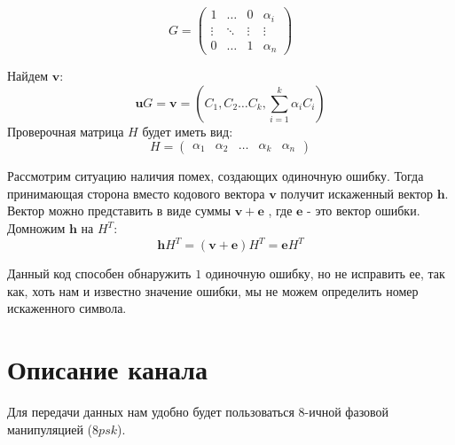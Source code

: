 \documentclass{ITaSconf}
\begin{document}
\begin{equation}\label{eq:pormatrix}
G = \left( \begin{array}{ccccccc}
1 & \dots  & 0 & \alpha_i \\
\vdots       &\ddots &  \vdots &  \vdots \\ 
0 & \dots  &  1&\alpha_n \end{array} \right)  
  \end{equation}

Найдем $\mathbold{v}$:
\begin{equation}\label{eq:kod}
\mathbold{u}G=\mathbold{v}=(C_1 , C_2 \dots C_k,\sum_{i=1}^k \alpha_i C_i)
 \end{equation}
Проверочная матрица $H$ будет иметь вид:
\begin{equation}H = \left( \begin{array}{ccccccc}\label{eq:H}
\alpha_1 & \alpha_2 &  \dots & \alpha_k & \alpha_n \end{array} \right) \end{equation}

Рассмотрим ситуацию наличия помех, создающих одиночную ошибку. Тогда принимающая сторона вместо кодового вектора $\mathbold{v}$  получит искаженный вектор $\mathbold{h}$. Вектор  можно представить в виде суммы
$\mathbold{v}+\mathbold{e}$ , где $\mathbold{e}$  - это вектор ошибки. Домножим $\mathbold{h}$ на $H^T$:
\begin{equation}\label{eq:syndrom}
 \mathbold{h}H^T=(\mathbold{v}+\mathbold{e})H^T=\mathbold{e}H^T
 \end{equation}
 
 Данный код способен обнаружить $1$ одиночную ошибку, но не исправить ее, так как, хоть нам и известно значение ошибки, мы не можем определить номер искаженного символа.

\section{Описание канала}
\label{sec:chanel}

Для передачи данных нам удобно будет пользоваться 8-ичной фазовой манипуляцией ($8psk$).
\end{document}
